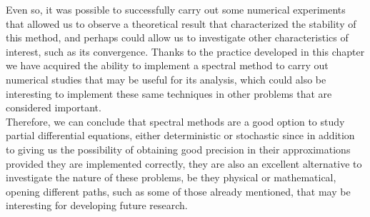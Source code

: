 	Even so, it was possible to successfully carry out some numerical experiments that allowed us to observe a theoretical result that characterized the stability of this method, and perhaps could allow us to investigate other characteristics of interest, such as its convergence. Thanks to the practice developed in this chapter we have acquired the ability to implement a spectral method to carry out numerical studies that may be useful for its analysis, which could also be interesting to implement these same techniques in other problems that are considered important. \\
	
	Therefore, we can conclude that spectral methods are a good option to study partial differential equations, either deterministic or stochastic since in addition to giving us the possibility of obtaining good precision in their approximations provided they are implemented correctly, they are also an excellent alternative to investigate the nature of these problems, be they physical or mathematical, opening different paths, such as some of those already mentioned, that may be interesting for developing future research.
	
	
	